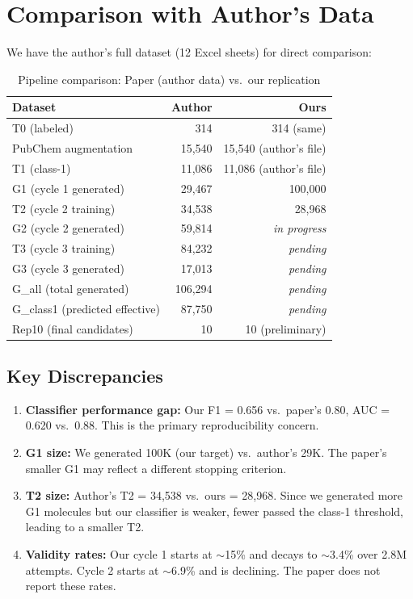 \documentclass[11pt]{article}
\begin{document}
\section{Comparison with Author's Data}

We have the author's full dataset (12 Excel sheets) for direct comparison:

\begin{table}[H]
\centering
\caption{Pipeline comparison: Paper (author data) vs.\ our replication}
\label{tab:comparison}
\begin{tabular}{@{}lrr@{}}
\toprule
\textbf{Dataset} & \textcolor{paperblue}{\textbf{Author}} & \textcolor{oursred}{\textbf{Ours}} \\
\midrule
T0 (labeled) & 314 & 314 (same) \\
PubChem augmentation & 15,540 & 15,540 (author's file) \\
T1 (class-1) & 11,086 & 11,086 (author's file) \\
\midrule
G1 (cycle 1 generated) & 29,467 & 100,000 \\
T2 (cycle 2 training) & 34,538 & 28,968 \\
G2 (cycle 2 generated) & 59,814 & \textit{in progress} \\
T3 (cycle 3 training) & 84,232 & \textit{pending} \\
G3 (cycle 3 generated) & 17,013 & \textit{pending} \\
\midrule
G\_all (total generated) & 106,294 & \textit{pending} \\
G\_class1 (predicted effective) & 87,750 & \textit{pending} \\
Rep10 (final candidates) & 10 & 10 (preliminary) \\
\bottomrule
\end{tabular}
\end{table}

\subsection{Key Discrepancies}

\begin{enumerate}[leftmargin=*]
    \item \textbf{Classifier performance gap:} Our F1 = 0.656 vs.\ paper's 0.80, AUC = 0.620 vs.\ 0.88. This is the primary reproducibility concern.
    \item \textbf{G1 size:} We generated 100K (our target) vs.\ author's 29K. The paper's smaller G1 may reflect a different stopping criterion.
    \item \textbf{T2 size:} Author's T2 = 34,538 vs.\ ours = 28,968. Since we generated more G1 molecules but our classifier is weaker, fewer passed the class-1 threshold, leading to a smaller T2.
    \item \textbf{Validity rates:} Our cycle 1 starts at $\sim$15\% and decays to $\sim$3.4\% over 2.8M attempts. Cycle 2 starts at $\sim$6.9\% and is declining. The paper does not report these rates.
\end{enumerate}
\end{document}
